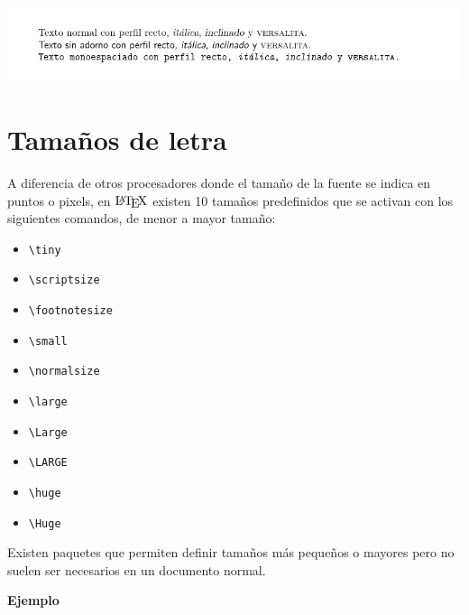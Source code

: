\documentclass[
  a4paper,
]{scrreport}
\providecommand{\tightlist}{%
  \setlength{\itemsep}{0pt}\setlength{\parskip}{0pt}}\usepackage{longtable,booktabs,array}
\begin{document}
\begin{tcolorbox}[enhanced jigsaw, bottomrule=.15mm, leftrule=.75mm, opacityback=0, titlerule=0mm, bottomtitle=1mm, colbacktitle=quarto-callout-note-color!10!white, arc=.35mm, toprule=.15mm, colframe=quarto-callout-note-color-frame, title={Salida}, coltitle=black, colback=white, breakable, toptitle=1mm, rightrule=.15mm, left=2mm, opacitybacktitle=0.6]

\includegraphics{./img/formateo/perfiles-letra.png}

\end{tcolorbox}

\hypertarget{tamauxf1os-de-letra}{%
\section{Tamaños de letra}\label{tamauxf1os-de-letra}}

A diferencia de otros procesadores donde el tamaño de la fuente se
indica en puntos o pixels, en \(\text{\LaTeX}\) existen 10 tamaños
predefinidos que se activan con los siguientes comandos, de menor a
mayor tamaño:

\begin{itemize}
\tightlist
\item
  \texttt{\textbackslash{}tiny}
\item
  \texttt{\textbackslash{}scriptsize}
\item
  \texttt{\textbackslash{}footnotesize}
\item
  \texttt{\textbackslash{}small}
\item
  \texttt{\textbackslash{}normalsize}
\item
  \texttt{\textbackslash{}large}
\item
  \texttt{\textbackslash{}Large}
\item
  \texttt{\textbackslash{}LARGE}
\item
  \texttt{\textbackslash{}huge}
\item
  \texttt{\textbackslash{}Huge}
\end{itemize}

Existen paquetes que permiten definir tamaños más pequeños o mayores
pero no suelen ser necesarios en un documento normal.

\textbf{Ejemplo}
\end{document}

